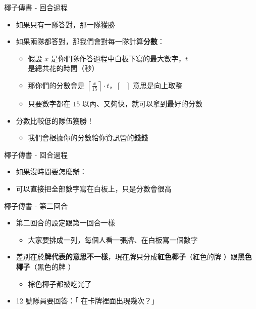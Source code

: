\begin{frame}{椰子傳書 - 回合過程}
  \begin{itemize}
    \item 如果只有一隊答對，那一隊獲勝
    \item 如果兩隊都答對，那我們會對每一隊計算\textbf{分數}：
    \begin{itemize}
      \item 假設 $x$ 是你們隊作答過程中白板下寫的最大數字，$t$ 是總共花的時間（秒）
      \item 那你們的分數會是 $\left\lceil \frac{x}{15} \right\rceil \cdot t$，$\left\lceil \text{ } \right\rceil$ 意思是向上取整
      \item 只要數字都在 $15$ 以內、又夠快，就可以拿到最好的分數
    \end{itemize}
    \item 分數比較低的隊伍獲勝！
    \begin{itemize}
      \item 我們會根據你的分數給你資訊營的錢錢
    \end{itemize}
  \end{itemize}
\end{frame}

\begin{frame}{椰子傳書 - 回合過程}
  \begin{itemize}
    \item 如果沒時間要怎麼辦：
    \item 可以直接把全部數字寫在白板上，只是分數會很高 
  \end{itemize}
\end{frame}

\begin{frame}{椰子傳書 - 第二回合}
  \begin{itemize}
    \item 第二回合的設定跟第一回合一樣
    \begin{itemize}
      \item 大家要排成一列，每個人看一張牌、在白板寫一個數字
    \end{itemize}
    \item 差別在於\textbf{牌代表的意思不一樣}，現在牌只分成\textbf{紅色椰子}（紅色的牌 ）跟\textbf{黑色椰子}（黑色的牌 ）
    \begin{itemize}
      \item 棕色椰子都被吃光了
    \end{itemize}
    \item 12 號隊員要回答：「 在卡牌裡面出現幾次？」
  \end{itemize}
\end{frame}

